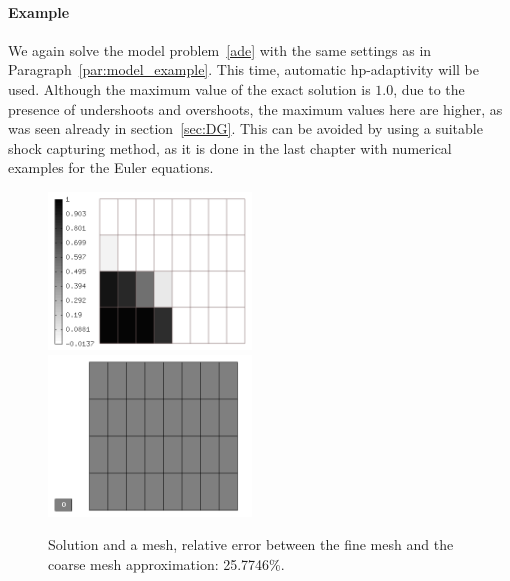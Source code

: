 \paragraph{Example}
We again solve the model problem~\eqref{ade} with the same settings as in Paragraph~\ref{par:model_example}. This time, automatic hp-adaptivity will be used. Although the maximum value of the exact solution is $1.0$, due to the presence of undershoots and overshoots, the maximum values here are higher, as was seen already in section~\ref{sec:DG}. This can be avoided by using a suitable shock capturing method, as it is done in the last chapter with numerical examples for the Euler equations.
\begin{figure}[H]
\begin{center}
\includegraphics[width=0.48\textwidth]{minor_examples/Sln1.png}\ \ \ 
\includegraphics[width=0.48\textwidth]{minor_examples/Space1.png}
\end{center}
\vspace{-4mm}
\caption{Solution and a mesh, relative error between the fine mesh and the coarse mesh approximation: 25.7746\%.}
\end{figure}

